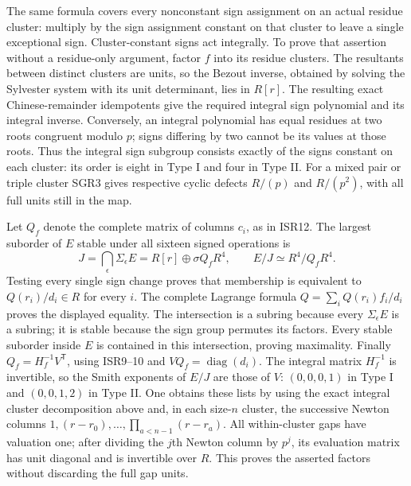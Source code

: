 \documentclass[11pt]{article}
\begin{document}
The same formula covers every nonconstant sign assignment on an actual
residue cluster: multiply by the sign assignment constant on that
cluster to leave a single exceptional sign. Cluster-constant signs
act integrally. To prove that assertion without a residue-only
argument, factor $f$ into its residue clusters. The resultants between
distinct clusters are units, so the Bezout inverse, obtained by solving
the Sylvester system with its unit determinant, lies in $R[r]$.
The resulting exact Chinese-remainder idempotents give the required
integral sign polynomial and its integral inverse. Conversely, an
integral polynomial has equal residues at two roots congruent modulo
$p$; signs differing by two cannot be its values at those roots.
Thus the integral sign subgroup consists exactly of the signs constant
on each cluster: its order is eight in Type I and four in Type II.
For a mixed pair or triple cluster SGR3 gives respective cyclic
defects $R/(p)$ and $R/(p^2)$, with all full units still in the map.

Let $Q_f$ denote the complete matrix of columns $c_i$, as in ISR12.
The largest suborder of $E$ stable under all sixteen signed operations is
\[
 J=\bigcap_\epsilon\Sigma_\epsilon E
   =R[r]\oplus\sigma Q_fR^4,
 \qquad
 E/J\simeq R^4/Q_fR^4.
 \tag{SGR4}
\]
Testing every single sign change proves that membership is equivalent
to $Q(r_i)/d_i\in R$ for every $i$. The complete Lagrange formula
$Q=\sum_i Q(r_i)f_i/d_i$ proves the displayed equality. The
intersection is a subring because every $\Sigma_\epsilon E$ is a
subring; it is stable because the sign group permutes its factors.
Every stable suborder inside $E$ is contained in this intersection,
proving maximality. Finally $Q_f=H_f^{-1}V^{\mathsf T}$, using
ISR9--10 and $VQ_f=\operatorname{diag}(d_i)$. The integral matrix
$H_f^{-1}$ is invertible, so the Smith exponents of $E/J$ are those
of $V$: $(0,0,0,1)$ in Type I and $(0,0,1,2)$ in Type II.
One obtains these lists by using the exact integral cluster
decomposition above and, in each size-$n$ cluster, the successive
Newton columns $1,(r-r_0),\ldots,\prod_{a<n-1}(r-r_a)$.
All within-cluster gaps have valuation one; after dividing the $j$th
Newton column by $p^j$, its evaluation matrix has unit diagonal and
is invertible over $R$. This proves the asserted factors without
discarding the full gap units.
\end{document}
